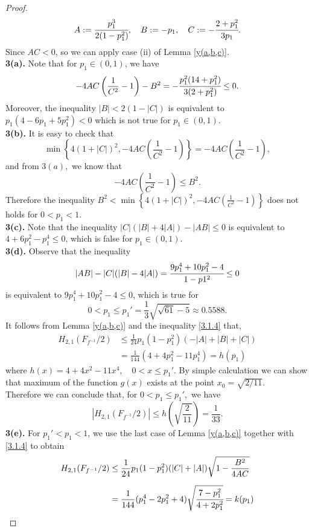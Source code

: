 \documentclass[10pt,a4paper]{amsart}
\begin{document}
\begin{proof}
$$
A:=\cfrac{p_1^3}{2(1-p_1^2)}, \quad B:=-p_1,\quad C:=-\cfrac{2+p_1^2}{3p_1}.
$$
Since $AC < 0$, so we can apply case (ii) of Lemma \ref{y(a,b,c)}.\\
[3mm]
\textbf{3(a).} Note that for $p_{1} \in(0,1)$, we have
$$
-4 A C\left(\frac{1}{C^{2}}-1\right)-B^{2}=-\cfrac{p_{1}^{2}(14+p_1^2)}{3(2+p_{1}^{2})} \leq  0.
$$
Moreover, the inequality $|B|<2(1-|C|)$ is equivalent to $p_1(4 - 6 p_1 + 5 p_1^2) < 0$ which is not true for $p_{1} \in(0,1)$.\\
[3mm]
\textbf{3(b).} It is easy to check that
$$
\min \left\{4(1+|C|)^{2},-4 A C\left(\frac{1}{C^{2}}-1\right)\right\}=-4 A C\left(\frac{1}{C^{2}}-1\right),
$$
and from $3(a),$ we know that 
$$
-4 A C\left(\frac{1}{C^{2}}-1\right) \leq B^{2}.
$$
Therefore the inequality $B^{2} < \min \left\{4(1+|C|)^{2},-4 A C\left(\frac{1}{C^{2}}-1\right)\right\}$ does not holds for $0<p_1<1$.\\[2mm]
\textbf{3(c).} Note that the inequality $|C|(|B|+4|A|)-|A B| \leq 0$ is equivalent to $4+6p_1^2
-p_1^4\leq 0$, which is false for $p_{1} \in(0,1)$.\\
[2mm]
\textbf{3(d).}
Observe that the inequality 
$$|A B|-|C|(|B|-4|A|)=\cfrac{9 p_1^4+10 p_1^2-4}{1 - p1^2} \leq 0
$$
is equivalent to $9 p_1^4+10 p_1^2-4\leq 0$, which is true for 
$$
0<p_1 \leq p_1'=\frac{1}{3}\sqrt{\sqrt{61}-5}\approx 0.5588.
$$
It follows from Lemma \ref{y(a,b,c)} and the inequality \eqref{3.1.4} that,
\begin{equation}
\begin{aligned}
H_{2,1}(F_{f^{-1}}/2)
&\leq \frac{1}{24}p_1(1-p_1^2)(-|A|+|B|+|C|)\\
&= \frac{1}{144}(4+4p_1^2-11p_1^4)=h(p_1)
\end{aligned}
\end{equation}
where $h(x)=4+4x^2-11x^4, \quad 0<x\leq p_1'$.
By simple calculation we can show that maximum of the function $g(x)$ exists at the point $x_0=\sqrt{2/11}$. \\
Therefore we can conclude that, for $0<p_1\leq p_1',$ we have
$$
|H_{2,1}(F_{f^{-1}}/2)|\leq h\left(\sqrt{\frac{2}{11}}\right)=\frac{1}{33}.
$$
\textbf{3(e).} For $p_1'<p_1<1$, we use the last case of Lemma \ref{y(a,b,c)} together with \eqref{3.1.4} to obtain
\begin{equation}
\begin{aligned}
H_{2,1}(F_{f^{-1}}/2)
&\leq \frac{1}{24}p_1(1-p_1^2)(|C|+|A|) \sqrt{1-\frac{B^{2}}{4 A C}}\\[2mm]
&= \frac{1}{144}(p_1^4-2p_1^2+4)\sqrt{\cfrac{7-p_1^2}{4+2p_1^2}}=k(p_1)

\end{aligned}
\end{equation}
\end{proof}
\end{document}
